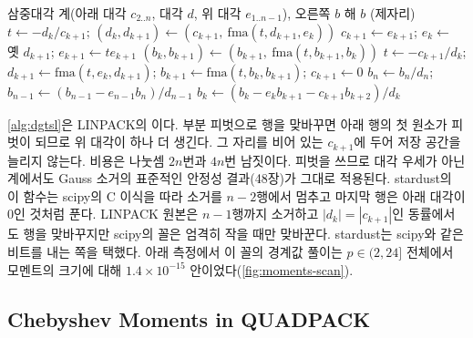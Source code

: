 \begin{algorithm}[htbp]
\begin{algorithmic}[1]
\Require 삼중대각 계(아래 대각 $c_{2..n}$, 대각 $d$, 위 대각 $e_{1..n-1}$), 오른쪽 $b$
\Ensure 해 $b$ (제자리)
   
    \State $t\gets-d_k/c_{k+1}$; $(d_k,d_{k+1})\gets(c_{k+1},\ \mathrm{fma}(t,d_{k+1},e_k))$
    \State $c_{k+1}\gets e_{k+1}$; $e_k\gets$ 옛 $d_{k+1}$; $e_{k+1}\gets te_{k+1}$ 
    \State $(b_k,b_{k+1})\gets(b_{k+1},\ \mathrm{fma}(t,b_{k+1},b_k))$
  \Else
    \State $t\gets-c_{k+1}/d_k$; $d_{k+1}\gets\mathrm{fma}(t,e_k,d_{k+1})$; $b_{k+1}\gets\mathrm{fma}(t,b_k,b_{k+1})$; $c_{k+1}\gets0$
  \EndIf
\EndFor
\State $b_n\gets b_n/d_n$; $b_{n-1}\gets(b_{n-1}-e_{n-1}b_n)/d_{n-1}$
 $b_k\gets(b_k-e_kb_{k+1}-c_{k+1}b_{k+2})/d_k$
\EndFor
\end{algorithmic}
\caption{부분 피벗을 쓰는 삼중대각 풀이 (LINPACK 의 scipy C 이식; stardust )}
\label{alg:dgtsl}
\end{algorithm}

\cref{alg:dgtsl}은 LINPACK의 이다. 부분 피벗으로 행을 맞바꾸면 아래 행의 첫 원소가 피벗이 되므로 위 대각이 하나 더 생긴다. 그 자리를 비어 있는 $c_{k+1}$에 두어 저장 공간을 늘리지 않는다. 비용은 나눗셈 $2n$번과  $4n$번 남짓이다. 피벗을 쓰므로 대각 우세가 아닌 계에서도 Gauss 소거의 표준적인 안정성 결과(48장)가 그대로 적용된다. stardust의 이 함수는 scipy의 C 이식을 따라 소거를 $n-2$행에서 멈추고 마지막 행은 아래 대각이 $0$인 것처럼 푼다. LINPACK 원본은 $n-1$행까지 소거하고 $|d_k|=|c_{k+1}|$인 동률에서도 행을 맞바꾸지만 scipy의 꼴은 엄격히 작을 때만 맞바꾼다. stardust는 scipy와 같은 비트를 내는 쪽을 택했다. 아래 측정에서 이 꼴의 경계값 풀이는 $p\in(2,24]$ 전체에서 모멘트의 크기에 대해 $1.4\times10^{-15}$ 안이었다(\cref{fig:moments-scan}).

\subsection{Chebyshev Moments in QUADPACK}

